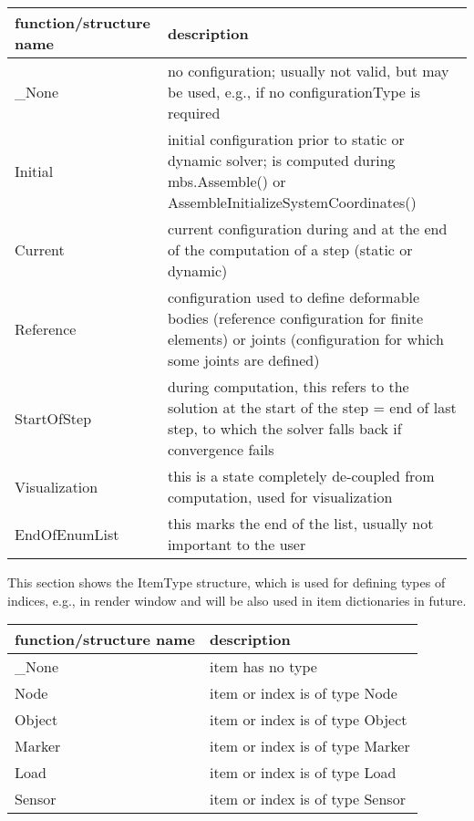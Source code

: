 \begin{center}
\footnotesize
\begin{longtable}{| p{8cm} | p{8cm} |} 
\hline
{\bf function/structure name} & {\bf description}\\ \hline
  \_None & no configuration; usually not valid, but may be used, e.g., if no configurationType is required\\ \hline 
  Initial & initial configuration prior to static or dynamic solver; is computed during mbs.Assemble() or AssembleInitializeSystemCoordinates()\\ \hline 
  Current & current configuration during and at the end of the computation of a step (static or dynamic)\\ \hline 
  Reference & configuration used to define deformable bodies (reference configuration for finite elements) or joints (configuration for which some joints are defined)\\ \hline 
  StartOfStep & during computation, this refers to the solution at the start of the step = end of last step, to which the solver falls back if convergence fails\\ \hline 
  Visualization & this is a state completely de-coupled from computation, used for visualization\\ \hline 
  EndOfEnumList & this marks the end of the list, usually not important to the user\\ \hline 
\end{longtable}
\end{center}

\label{sec:ItemType}
This section shows the ItemType structure, which is used for defining types of indices, e.g., in render window and will be also used in item dictionaries in future.



\begin{center}
\footnotesize
\begin{longtable}{| p{8cm} | p{8cm} |} 
\hline
{\bf function/structure name} & {\bf description}\\ \hline
  \_None & item has no type\\ \hline 
  Node & item or index is of type Node\\ \hline 
  Object & item or index is of type Object\\ \hline 
  Marker & item or index is of type Marker\\ \hline 
  Load & item or index is of type Load\\ \hline 
  Sensor & item or index is of type Sensor\\ \hline 
\end{longtable}
\end{center}

